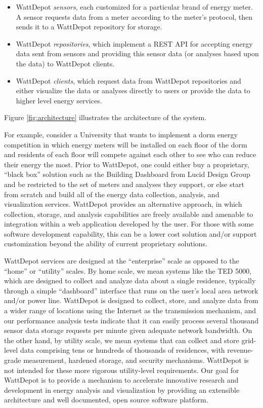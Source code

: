 \documentclass[conference,compsoc]{IEEEtran}
\begin{document}
\begin{itemize}
\item WattDepot {\em sensors}, each customized for a particular brand of
energy meter.  A sensor requests data from a meter according to the meter's
protocol, then sends it to a WattDepot repository for storage.

\item WattDepot {\em repositories}, which implement a REST \cite{REST} API
for accepting energy data sent from sensors and providing this sensor data
(or analyses based upon the data) to WattDepot clients.

\item WattDepot {\em clients}, which request data from WattDepot
repositories and either visualize the data or analyses directly to users or
provide the data to higher level energy services.
\end{itemize}

Figure \ref{fig:architecture} illustrates the architecture of the system.


For example, consider a University that wants to implement a dorm energy
competition in which energy meters will be installed on each floor of the
dorm and residents of each floor will compete against each other to see who
can reduce their energy the most.  Prior to WattDepot, one could either buy a
proprietary, ``black box'' solution such as the Building Dashboard from
Lucid Design Group and be restricted to the set of meters and analyses they
support, or else start from scratch and build all of the energy data
collection, analysis, and visualization services.  WattDepot provides an
alternative approach, in which collection, storage, and analysis
capabilities are freely available and amenable to integration within a web
application developed by the user.  For those with some software
development capability, this can be a lower cost solution and/or support
customization beyond the ability of current proprietary solutions.

WattDepot services are designed at the ``enterprise'' scale as opposed to
the ``home'' or ``utility'' scales.  By home scale, we mean systems like
the TED 5000, which are designed to collect and analyze data about a single
residence, typically through a simple ``dashboard'' interface that runs on
the user's local area network and/or power line.  WattDepot is designed to
collect, store, and analyze data from a wider range of locations using the
Internet as the transmission mechanism, and our performance analysis tests
indicate that it can easily process several thousand sensor data storage
requests per minute given adequate network bandwidth.  On the other hand,
by utility scale, we mean systems that can collect and store grid-level
data comprising tens or hundreds of thousands of residences, with
revenue-grade measurement, hardened storage, and security mechanisms.
WattDepot is not intended for these more rigorous utility-level
requirements.  Our goal for WattDepot is to provide a mechanism to
accelerate innovative research and development in energy analysis and
visualization by providing an extensible architecture and well documented,
open source software platform.
\end{document}

